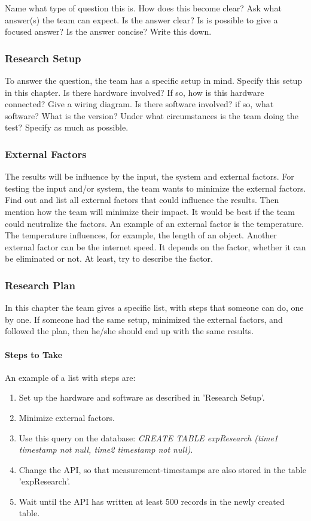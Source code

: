 \documentclass[10pt]{report}
\begin{document}
\noindent Name what type of question this is. How does this become clear? Ask what answer(s) the team can expect. Is the answer clear? Is is possible to give a focused answer? Is the answer concise? Write this down.

\subsubsection{Research Setup}

To answer the question, the team has a specific setup in mind. Specify this setup in this chapter. Is there hardware involved? If so, how is this hardware connected? Give a wiring diagram. Is there software involved? if so, what software? What is the version? Under what circumstances is the team doing the test? Specify as much as possible.

\subsubsection{External Factors}

The results will be influence by the input, the system and external factors. For testing the input and/or system, the team wants to minimize the external factors. Find out and list all external factors that could influence the results. Then mention how the team will minimize their impact. It would be best if the team could neutralize the factors. An example of an external factor is the temperature. The temperature influences, for example, the length of an object. Another external factor can be the internet speed. It depends on the factor, whether it can be eliminated or not. At least, try to describe the factor.

\subsubsection{Research Plan}

In this chapter the team gives a specific list, with steps that someone can do, one by one. If someone had the same setup, minimized the external factors, and followed the plan, then he/she should end up with the same results.

\paragraph{Steps to Take}

An example of a list with steps are:

\begin{enumerate}
	\item Set up the hardware and software as described in 'Research Setup'.
	\item Minimize external factors.
	\item Use this query on the database: \textit{CREATE TABLE expResearch (time1 timestamp not null, time2 timestamp not null)}.
	\item Change the API, so that measurement-timestamps are also stored in the table 'expResearch'. 
	\item Wait until the API has written at least 500 records in the newly created table.
\end{enumerate}
\end{document}
